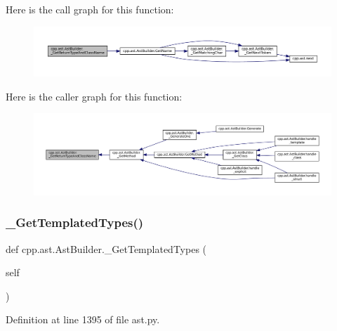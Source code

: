 Here is the call graph for this function\+:
\nopagebreak
\begin{figure}[H]
\begin{center}
\leavevmode
\includegraphics[width=350pt]{classcpp_1_1ast_1_1AstBuilder_abef1c7f48a562a67507bd7ed6f822710_cgraph}
\end{center}
\end{figure}
Here is the caller graph for this function\+:
\nopagebreak
\begin{figure}[H]
\begin{center}
\leavevmode
\includegraphics[width=350pt]{classcpp_1_1ast_1_1AstBuilder_abef1c7f48a562a67507bd7ed6f822710_icgraph}
\end{center}
\end{figure}
\mbox{\label{classcpp_1_1ast_1_1AstBuilder_a07d463f974a3a33de2840fc6965906c3}} 
\subsubsection{\texorpdfstring{\+\_\+\+Get\+Templated\+Types()}{\_GetTemplatedTypes()}}
{\footnotesize\ttfamily def cpp.\+ast.\+Ast\+Builder.\+\_\+\+Get\+Templated\+Types (\begin{DoxyParamCaption}\item[{}]{self }\end{DoxyParamCaption})\hspace{0.3cm}{\ttfamily [private]}}



Definition at line 1395 of file ast.\+py.



